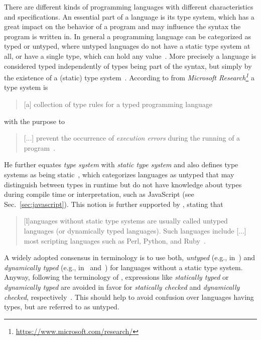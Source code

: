 There are different kinds of programming languages with different characteristics and specifications. An essential part of a language is its type system, which has a great impact on the behavior of a program and may influence the syntax the program is written in.
In general a programming language can be categorized as typed or untyped, where untyped languages do not have a static type system at all, or have a single type, which can hold any value~\cite[p.~2]{TypeSystems:Cardelli:2004}. More precisely a language is considered typed independently of types being part of the syntax, but simply by the existence of a (static) type system~\cite[p.~2]{TypeSystems:Cardelli:2004}.
According to \citeauthor{TypeSystems:Cardelli:2004} from \emph{Microsoft Research\footnote{\url{https://www.microsoft.com/research/}}} a type system is
\begin{quote}
  [a] collection of type rules for a typed programming language~\cite[p.~38]{TypeSystems:Cardelli:2004}
\end{quote}
with the purpose to
\begin{quote}
  [...] prevent the occurrence of \emph{execution errors} during the running of a program~\cite[p.~1]{TypeSystems:Cardelli:2004}.
\end{quote}
He further equates \emph{type system} with \emph{static type system} and also \citeauthor{TypesAndProgrammingLanguages:Pierce:2002} defines type systems as being static~\cite[p.~2]{TypesAndProgrammingLanguages:Pierce:2002}, which categorizes languages as untyped that may distinguish between types in runtime but do not have knowledge about types during compile time or interpretation, such as JavaScript (see Sec.~\ref{sec:javascript}). This notion is further supported by \citeauthor{ProgrammingLanguagesPrinciplesAndPractices:LoudenLambert:2011}, stating that
\begin{quote}
  [l]anguages without static type systems are usually called untyped languages (or dynamically typed languages). Such languages include [...] most scripting languages such as Perl, Python, and Ruby~\cite[p.~331]{ProgrammingLanguagesPrinciplesAndPractices:LoudenLambert:2011}.
\end{quote}
A widely adopted consensus in terminology is to use both, \emph{untyped} (e.g., in~\cite[p.~117]{LogicalTypesForUntypedLanguages:Tobin-Hochstadt:2010}) and \emph{dynamically typed} (e.g., in~\cite[p.~32]{TowardsAProgramLogicForJavaScript:Gardner:2012} and~\cite[p.~203]{TypeSystemsDirectedProgrammingLanguageEvolution:Nino:2012}) for languages without a static type system. Anyway, following the terminology of \citeauthor{TypeSystems:Cardelli:2004}, expressions like \emph{statically typed} or \emph{dynamically typed} are avoided in favor for \emph{statically checked} and \emph{dynamically checked}, respectively~\cite[p.~1]{TypeSystems:Cardelli:2004}. This should help to avoid confusion over languages having types, but are referred to as untyped.

